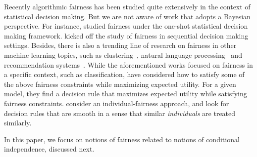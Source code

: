 



Recently algorithmic fairness has been studied quite extensively in
the context of statistical decision making.
But we are not aware of work that adopts
a Bayesian perspective. For instance,
\citep{dwork2012fairness,chouldechova2016fair,corbett2017algorithmic,kleinberg2016inherent,kilbertus2017avoiding}
studied fairness under the one-shot statistical decision making
framework. \citep{jabbari2016fair,joseph2016rawlsian} kicked off the
study of fairness in sequential decision making settings. Besides,
there is also a trending line of research on fairness in other machine
learning topics, such as clustering~\citep{Chierichetti2017fair},
natural language processing~\citep{BlodgettO17} and recommendation
systems~\citep{CelisV17}.  While the aforementioned works focused on
fairness in a specific context, such as classification,
\citep{corbett2017algorithmic} have considered how to satisfy some of
the above fairness constraints while maximizing expected utility.  For
a given model, they find a decision rule that maximizes expected
utility while satisfying fairness constraints. %
\citep{dwork2012fairness} consider
an individual-fairness approach,
and look for decision
rules that  are smooth in a sense that
similar \emph{individuals} are treated similarly.


In this paper, we focus on notions of fairness related to notions of
conditional independence, discussed next.

